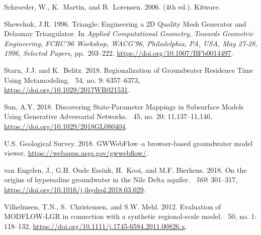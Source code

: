 \documentclass[12pt, oneside]{article}  	%
\begin{document}
\begin{thebibliography}{}
Schroeder, W., K.~Martin, and B.~Lorensen. 2006.
 (4th ed.).
\newblock Kitware.

Shewchuk, J.R. 1996.
\newblock Triangle: Engineering a {2D} Quality Mesh Generator and Delaunay
  Triangulator.
\newblock In {\em Applied Computational Geometry, Towards Geometric
  Engineering, FCRC'96 Workshop, WACG'96, Philadelphia, PA, USA, May 27-28,
  1996, Selected Papers}, pp.\  203--222.
  \url{https://doi.org/10.1007/BFb0014497}.

Starn, J.J. and K.~Belitz. 2018.
\newblock Regionalization of Groundwater Residence Time Using Metamodeling.
~54, no. 9: 6357--6373,
  \url{https://doi.org/10.1029/2017WR021531}.

Sun, A.Y. 2018.
\newblock Discovering State-Parameter Mappings in Subsurface Models Using
  Generative Adversarial Networks.
~45, no. 20: 11,137--11,146,
  \url{https://doi.org/10.1029/2018GL080404}.

{U.S. Geological Survey}. 2018.
\newblock GWWebFlow--a browser-based groundwater model viewer.
\newblock \url{https://webapps.usgs.gov/gwwebflow/}.

{van Engelen}, J., G.H. {Oude Essink}, H.~Kooi, and M.F. Bierkens. 2018.
\newblock On the origins of hypersaline groundwater in the {Nile Delta}
  aquifer.
~{\em 560}: 301--317,
  \url{https://doi.org/10.1016/j.jhydrol.2018.03.029}.

Vilhelmsen, T.N., S.~Christensen, and S.W. Mehl. 2012.
\newblock Evaluation of MODFLOW-LGR in connection with a synthetic
  regional-scale model.
~50, no. 1: 118--132,
  \url{https://doi.org/10.1111/j.1745-6584.2011.00826.x}.


\end{thebibliography}
\end{document}
